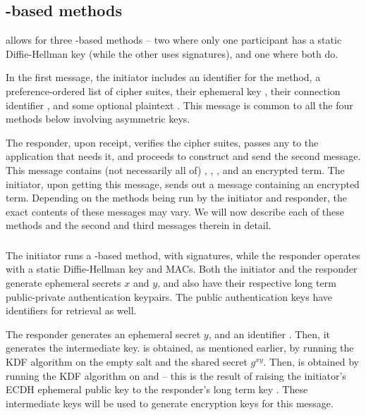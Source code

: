 {\subsection{\mStat-based methods}
\mEdhoc{} allows for three \mStat-based methods -- two where only one participant has a static Diffie-Hellman key (while the other uses signatures), and one where both do. 

In the first message, the initiator includes an identifier for the method, a preference-ordered list of cipher suites, their ephemeral key \mGx, their connection identifier \mCi, and some optional plaintext \mADone. This message is common to all the four methods below involving asymmetric keys. 

The responder, upon receipt, verifies the cipher suites, passes any \mADone{} to the application that needs it, and proceeds to construct and send the second message. This message contains (not necessarily all of) \mCi, \mGy, \mCr, and an encrypted term. The initiator, upon getting this message, sends out a message containing an encrypted term. Depending on the methods being run by the initiator and responder, the exact contents of these messages may vary. We will now describe each of these methods and the second and third messages therein in detail.

\subsubsection{\mSigStat}
The initiator runs a \mSigma-based method, with signatures, while the responder operates with a static Diffie-Hellman key and MACs. Both the initiator and the responder generate ephemeral secrets $x$ and $y$, and also have their respective long term public-private authentication keypairs. The public authentication keys have identifiers for retrieval as well.

The responder generates an ephemeral secret $y$, and an identifier \mCr. Then,
it generates the intermediate key. \mPRKtwo{} is obtained, as mentioned
earlier, by running the KDF algorithm on the empty salt and the shared secret
$g^{xy}$. Then, \mPRKthree is obtained by running the KDF algorithm on
\mPRKtwo{}
and \mGrx{}-- this is the result of raising the initiator's ECDH ephemeral public
key \mGx{} to the responder's long term key \mLtkr. These intermediate keys will be used to generate encryption keys for this message.

}

